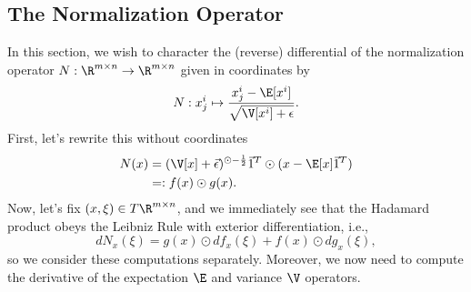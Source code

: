 \subsection{The Normalization Operator}
In this section, we wish to character the (reverse) differential of the normalization operator $N:\R^{m\times n}\to\R^{m\times n}$ given in coordinates by
$$N:x^i_j\mapsto \frac{x^i_j-\E[x^i]}{\sqrt{\V[x^i]+\epsilon}}.$$
First, let's rewrite this without coordinates
\begin{align*}
	N(x)&=(\V[x]+\vec{\epsilon})^{\odot-\frac{1}{2}}\vec{1}^T\odot(x-\E[x]\vec{1}^T)\\
	&=:f(x)\odot g(x).
\end{align*}
Now, let's fix $(x,\xi)\in T\R^{m\times n}$, and we immediately see that the Hadamard product obeys the Leibniz Rule with exterior differentiation, i.e.,
$$dN_x(\xi)=g(x)\odot df_x(\xi)+f(x)\odot dg_x(\xi),$$
so we consider these computations separately.  Moreover, we now need to compute the derivative of the expectation $\E$ and variance $\V$ operators.

